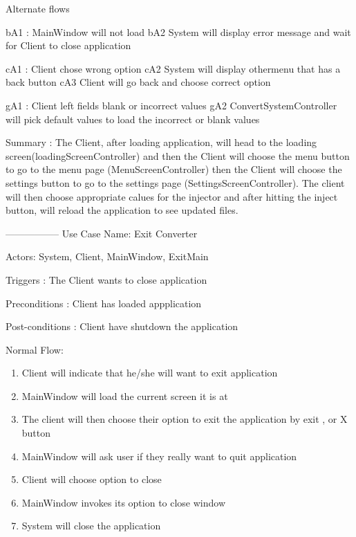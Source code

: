 \documentclass[12pt]{article}
\begin{document}
\begin{enumerate}
Alternate flows

bA1 : MainWindow will not load
\newline bA2 System will display error message and wait for Client to close application

cA1 : Client chose wrong option
\newline cA2 System will display othermenu that has a back button
\newline cA3 Client will go back and choose correct option

gA1 : Client left fields blank or incorrect values
\newline gA2 ConvertSystemController will pick default values to load the incorrect or blank values

Summary : The Client, after loading application, will head to the loading screen(loadingScreenController) and then the Client will choose the menu button to go to the menu page (MenuScreenController) then the Client will choose the settings button to go to the settings page (SettingsScreenController). The client will then choose appropriate calues for the injector and after hitting the inject button, will reload the application to see updated files.



\subitem -----------------
\newline Use Case Name: Exit Converter

Actors: System, Client, MainWindow, ExitMain

Triggers : The Client wants to close application

Preconditions : Client has loaded appplication

Post-conditions : Client have shutdown the application

Normal Flow:

\begin{enumerate}
	\item Client will indicate that he/she will want to exit application
	\item MainWindow will load the current screen it is at
	\item The client will then choose their option to exit the application by exit , or X button
	\item MainWindow will ask user if they really want to quit application
	\item Client will choose option to close
	\item MainWindow invokes its option to close window
	\item System will close the application
\end{enumerate}


\end{enumerate}
\end{document}
